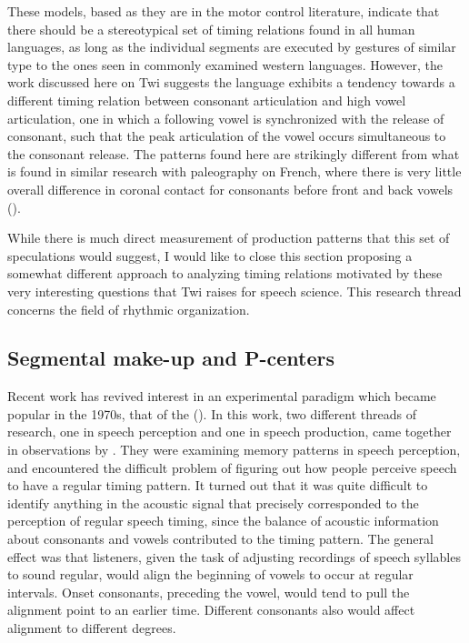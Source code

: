 \documentclass[output=paper,colorlinks,citecolor=brown]{langscibook}
\begin{document}
These models, based as they are in the motor control literature, indicate that there should be a stereotypical set of timing relations found in all human languages, as long as the individual segments are executed by gestures of similar type to the ones seen in commonly examined western languages. However, the work discussed here on Twi suggests the language exhibits a tendency towards a different timing relation between consonant articulation and high vowel articulation, one in which a following vowel is synchronized with the release of consonant, such that the peak articulation of the vowel occurs simultaneous to the consonant release. The patterns found here are strikingly different from what is found in similar research with paleography on French, where there is very little overall difference in coronal contact for consonants before front and back vowels (\citealt{Dart1991}). 

While there is much direct measurement of production patterns that this set of speculations would suggest, I would like to close this section proposing a somewhat different approach to analyzing timing relations motivated by these very interesting questions that Twi raises for speech science. This research thread concerns the field of  rhythmic organization. 

\subsection{Segmental make-up and P-centers}

Recent work has revived interest in an experimental paradigm which became popular in the 1970s, that of the  (\citealt{Allen1972, Mortonetal1976, Rapp1971}). In this work, two different threads of research, one in speech perception and one in speech production, came together in observations by \citet{Mortonetal1976}. They were examining memory patterns in speech perception, and encountered the difficult problem of figuring out how people perceive speech to have a regular timing pattern. It turned out that it was quite difficult to identify anything in the acoustic signal that precisely corresponded to the perception of regular speech timing, since the balance of acoustic information about consonants and vowels contributed to the timing pattern. The general effect was that listeners, given the task of adjusting recordings of speech syllables to sound regular, would align the beginning of vowels to occur at regular intervals. Onset consonants, preceding the vowel, would tend to pull the alignment point to an earlier time. Different consonants also would affect alignment to different degrees. 
\end{document}
